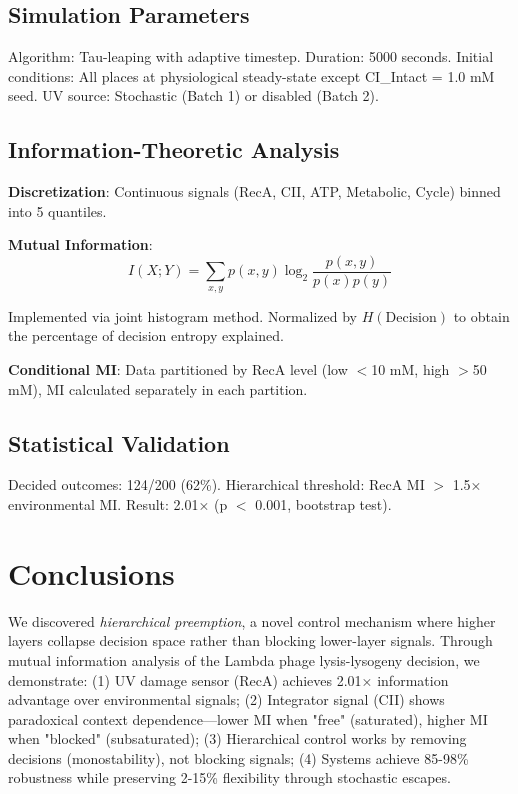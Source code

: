 \documentclass[10pt,twocolumn]{article}
\begin{document}
\subsection{Simulation Parameters}

Algorithm: Tau-leaping with adaptive timestep. Duration: 5000 seconds. Initial conditions: All places at physiological steady-state except CI\_Intact = 1.0 mM seed. UV source: Stochastic (Batch 1) or disabled (Batch 2).

\subsection{Information-Theoretic Analysis}

\textbf{Discretization}: Continuous signals (RecA, CII, ATP, Metabolic, Cycle) binned into 5 quantiles.

\textbf{Mutual Information}:
\begin{equation}
I(X;Y) = \sum_{x,y} p(x,y) \log_2 \frac{p(x,y)}{p(x)p(y)}
\end{equation}

Implemented via joint histogram method. Normalized by $H(\text{Decision})$ to obtain the percentage of decision entropy explained.

\textbf{Conditional MI}: Data partitioned by RecA level (low $<$10 mM, high $>$50 mM), MI calculated separately in each partition.

\subsection{Statistical Validation}

Decided outcomes: 124/200 (62\%). Hierarchical threshold: RecA MI $>$ 1.5× environmental MI. Result: 2.01× (p $<$ 0.001, bootstrap test).

\section{Conclusions}

We discovered \textit{hierarchical preemption}, a novel control mechanism where higher layers collapse decision space rather than blocking lower-layer signals. Through mutual information analysis of the Lambda phage lysis-lysogeny decision, we demonstrate: (1) UV damage sensor (RecA) achieves 2.01× information advantage over environmental signals; (2) Integrator signal (CII) shows paradoxical context dependence—lower MI when "free" (saturated), higher MI when "blocked" (subsaturated); (3) Hierarchical control works by removing decisions (monostability), not blocking signals; (4) Systems achieve 85-98\% robustness while preserving 2-15\% flexibility through stochastic escapes.
\end{document}
